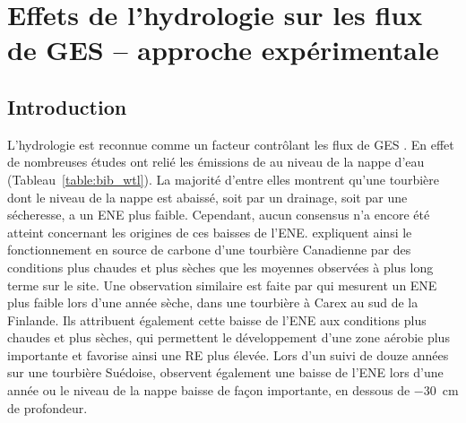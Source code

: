 \singlespacing
\chapter{Effets de l'hydrologie sur les flux de GES -- approche expérimentale}
\label{ch:4}

\minitoc

\newpage
\doublespacing
\section{Introduction}


L'hydrologie est reconnue comme un facteur contrôlant les flux de GES \citep{blodau2002}.
En effet de nombreuses études ont relié les émissions de \coo au niveau de la nappe d'eau (Tableau~\ref{table:bib_wtl}).
La majorité d'entre elles montrent qu'une tourbière dont le niveau de la nappe est abaissé, soit par un drainage, soit par une sécheresse, a un ENE plus faible.
Cependant, aucun consensus n'a encore été atteint concernant les origines de ces baisses de l'ENE.
\citet{strack2013} expliquent ainsi le fonctionnement en source de carbone d'une tourbière Canadienne par des conditions plus chaudes et plus sèches que les moyennes observées à plus long terme sur le site.
Une observation similaire est faite par \citet{aurela2007} qui mesurent un ENE plus faible lors d'une année sèche, dans une tourbière à Carex au sud de la Finlande.
Ils attribuent également cette baisse de l'ENE aux conditions plus chaudes et plus sèches, qui permettent le développement d'une zone aérobie plus importante et favorise ainsi une RE plus élevée.
Lors d'un suivi de douze années sur une tourbière Suédoise, \citet{peichl2014} observent également une baisse de l'ENE lors d'une année ou le niveau de la nappe baisse de façon importante, en dessous de \SI{-30}{\centi\metre} de profondeur.

